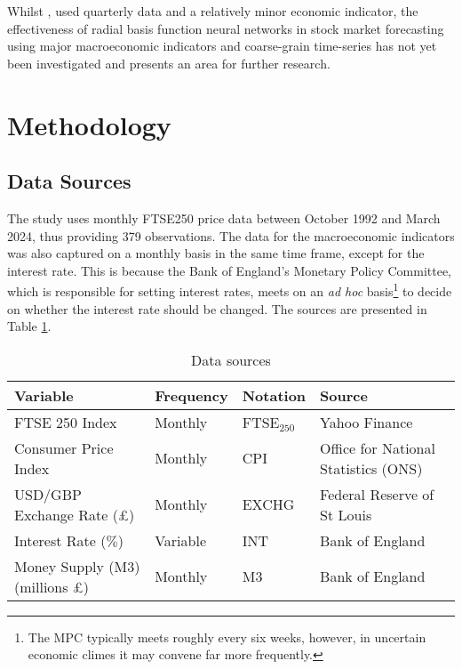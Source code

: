 \documentclass[11pt,a4paper]{article}
\newcommand{\citeboth}[1]{\citeauthor{#1} \citep{#1}}
\begin{document}
Whilst \citeboth{abotaleb2024}, used quarterly data and a relatively minor economic indicator, the effectiveness of radial basis function neural networks in stock market forecasting using 
major macroeconomic indicators and coarse-grain time-series has not yet been investigated and presents an area for further 
research. 

\section{Methodology}
\label{sec:meth}

\subsection{Data Sources}

The study uses monthly FTSE250 price data between October 1992 and March 2024,
thus providing 379 observations. The data for the macroeconomic indicators 
was also captured on a monthly basis in the same time frame, except for the 
interest rate. This is because the Bank of England's Monetary Policy 
Committee, 
which is responsible for setting interest rates, meets on an \textit{ad hoc} 
basis\footnote{The MPC typically meets roughly every six weeks, however, in uncertain economic 
climes it may convene far more frequently.}
to decide on whether the interest rate should be changed. The sources 
are presented in Table \ref{table: tabl}.

\clearpage
\begin{table}[h!]
    \centering
    \caption{Data sources}
    \label{table: tabl}
    \begin{tabular}{llll}
        \toprule
        \textbf{Variable} & \textbf{Frequency} & \textbf{Notation} & \textbf{Source} \\
        \midrule
        FTSE 250 Index & Monthly & FTSE$_{250}$ & Yahoo Finance \\
        Consumer Price Index & Monthly & CPI & Office for National Statistics (ONS) \\
        USD/GBP Exchange Rate (£) & Monthly & EXCHG & Federal Reserve of St Louis \\
        Interest Rate ($\%$) & Variable & INT & Bank of England \\
        Money Supply (M3) (millions £) & Monthly & M3 & Bank of England \\
        \bottomrule
    \end{tabular}
\end{table}
\end{document}
